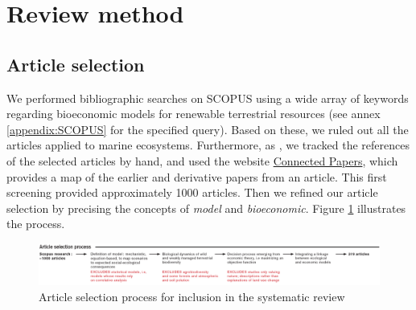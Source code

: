 \section{Review method}\label{sec:reviewmethod}


\subsection{Article selection }\label{sec:art_selec} 

We performed bibliographic searches on SCOPUS using a wide array of keywords regarding bioeconomic models for renewable terrestrial resources (see annex \ref{appendix:SCOPUS} for the specified query).
Based on these, we ruled out all the articles applied to marine ecosystems. Furthermore, as \cite{Eppink2007}, we tracked the references of the selected articles by hand, and used the website \href{https://www.connectedpapers.com}{Connected Papers}, which provides a map of the earlier and derivative papers from an article. This first screening provided approximately 1000 articles.
Then we refined our article selection by precising the concepts of \textit{model} and \textit{bioeconomic}. Figure \ref{fig:selection_process} illustrates the process.


\begin{figure}[h]
    \centering
    \includegraphics[width=\linewidth]{figures/review/selection_process.png}
    \caption{Article selection process for inclusion in the systematic review}
    \label{fig:selection_process}
\end{figure}



